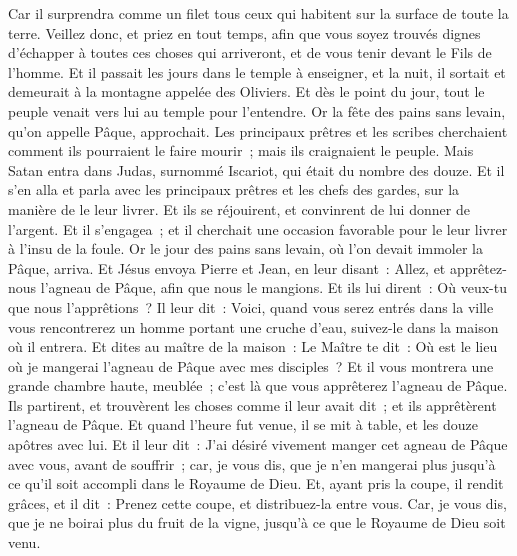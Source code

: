 \begin{multicols}{2}
Car il surprendra comme un filet tous ceux qui habitent sur la surface de toute la terre.
Veillez donc, et priez en tout temps, afin que vous soyez trouvés dignes d'échapper à toutes ces choses qui arriveront, et de vous tenir devant le Fils de l'homme.
Et il passait les jours dans le temple à enseigner, et la nuit, il sortait et demeurait à la montagne appelée des Oliviers.
Et dès le point du jour, tout le peuple venait vers lui au temple pour l'entendre.
\VerseOne{}Or la fête des pains sans levain, qu'on appelle Pâque, approchait.
Les principaux prêtres et les scribes cherchaient comment ils pourraient le faire mourir~; mais ils craignaient le peuple.
Mais Satan entra dans Judas, surnommé Iscariot, qui était du nombre des douze.
Et il s'en alla et parla avec les principaux prêtres et les chefs des gardes, sur la manière de le leur livrer.
Et ils se réjouirent, et convinrent de lui donner de l'argent.
Et il s'engagea~; et il cherchait une occasion favorable pour le leur livrer à l'insu de la foule.
Or le jour des pains sans levain, où l'on devait immoler la Pâque, arriva.
Et Jésus envoya Pierre et Jean, en leur disant~: Allez, et apprêtez-nous l'agneau de Pâque, afin que nous le mangions.
Et ils lui dirent~: Où veux-tu que nous l'apprêtions~?
Il leur dit~: Voici, quand vous serez entrés dans la ville vous rencontrerez un homme portant une cruche d'eau, suivez-le dans la maison où il entrera.
Et dites au maître de la maison~: Le Maître te dit~: Où est le lieu où je mangerai l'agneau de Pâque avec mes disciples~?
Et il vous montrera une grande chambre haute, meublée~; c'est là que vous apprêterez l'agneau de Pâque.
Ils partirent, et trouvèrent les choses comme il leur avait dit~; et ils apprêtèrent l'agneau de Pâque.
Et quand l'heure fut venue, il se mit à table, et les douze apôtres avec lui.
Et il leur dit~: J'ai désiré vivement manger cet agneau de Pâque avec vous, avant de souffrir~;
car, je vous dis, que je n'en mangerai plus jusqu'à ce qu'il soit accompli dans le Royaume de Dieu.
Et, ayant pris la coupe, il rendit grâces, et il dit~: Prenez cette coupe, et distribuez-la entre vous.
Car, je vous dis, que je ne boirai plus du fruit de la vigne, jusqu'à ce que le Royaume de Dieu soit venu.

\end{multicols}
